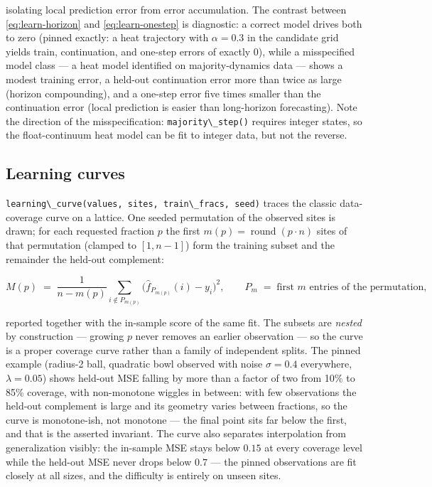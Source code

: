 \documentclass[
  10pt,
]{article}
\newcommand{\passthrough}[1]{#1}
\begin{document}
isolating local prediction error from error accumulation. The contrast
between \eqref{eq:learn-horizon} and \eqref{eq:learn-onestep} is
diagnostic: a correct model drives both to zero (pinned exactly: a heat
trajectory with \(\alpha = 0.3\) in the candidate grid yields train,
continuation, and one-step errors of exactly \(0\)), while a
misspecified model class --- a heat model identified on
majority-dynamics data --- shows a modest training error, a held-out
continuation error more than twice as large (horizon compounding), and a
one-step error five times smaller than the continuation error (local
prediction is easier than long-horizon forecasting). Note the direction
of the misspecification: \passthrough{\lstinline!majority\_step()!}
requires integer states, so the float-continuum heat model can be fit to
integer data, but not the reverse.

\subsection{Learning curves}\label{learning-curves}

\passthrough{\lstinline!learning\_curve(values, sites, train\_fracs, seed)!}
traces the classic data-coverage curve on a lattice. One seeded
permutation of the observed sites is drawn; for each requested fraction
\(p\) the first \(m(p) = \operatorname{round}(p \cdot n)\) sites of that
permutation (clamped to \([1, n-1]\)) form the training subset and the
remainder the held-out complement:

\begin{equation}
\label{eq:learn-curve}
M(p) \;=\; \frac{1}{n - m(p)} \sum_{i \notin P_{m(p)}}
\bigl( \hat{f}_{P_{m(p)}}(i) - y_i \bigr)^{2},
\qquad P_{m} \;=\; \text{first } m \text{ entries of the permutation},
\end{equation}

reported together with the in-sample score of the same fit. The subsets
are \emph{nested} by construction --- growing \(p\) never removes an
earlier observation --- so the curve is a proper coverage curve rather
than a family of independent splits. The pinned example (radius-2 ball,
quadratic bowl observed with noise \(\sigma = 0.4\) everywhere,
\(\lambda = 0.05\)) shows held-out MSE falling by more than a factor of
two from 10\% to 85\% coverage, with non-monotone wiggles in between:
with few observations the held-out complement is large and its geometry
varies between fractions, so the curve is monotone-ish, not monotone ---
the final point sits far below the first, and that is the asserted
invariant. The curve also separates interpolation from generalization
visibly: the in-sample MSE stays below \(0.15\) at every coverage level
while the held-out MSE never drops below \(0.7\) --- the pinned
observations are fit closely at all sizes, and the difficulty is
entirely on unseen sites.
\end{document}
